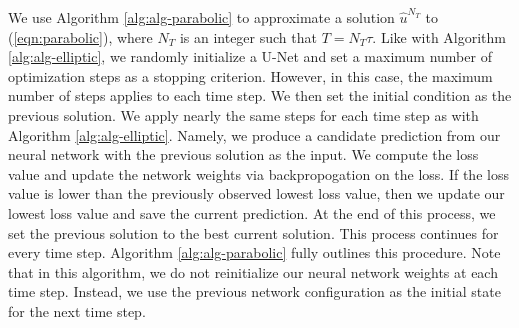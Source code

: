 \documentclass[preprint,12pt]{elsarticle}
\newcommand{\bftheta}{\boldsymbol{\theta}}
\begin{document}

We use Algorithm \ref{alg:alg-parabolic} to approximate a solution $\hat{u}^{N_T}$ to (\ref{eqn:parabolic}), where $N_T$ is an integer such that $T = N_T \tau$. Like with Algorithm \ref{alg:alg-elliptic}, we randomly initialize a U-Net and set a maximum number of optimization steps as a stopping criterion. However, in this case, the maximum number of steps applies to each time step. We then set the initial condition as the previous solution. We apply nearly the same steps for each time step as with Algorithm \ref{alg:alg-elliptic}. Namely, we produce a candidate prediction from our neural network with the previous solution as the input. We compute the loss value and update the network weights via backpropogation on the loss. If the loss value is lower than the previously observed lowest loss value, then we update our lowest loss value and save the current prediction. At the end of this process, we set the previous solution to the best current solution. This process continues for every time step. Algorithm \ref{alg:alg-parabolic} fully outlines this procedure. Note that in this algorithm, we do not reinitialize our neural network weights at each time step. Instead, we use the previous network configuration as the initial state for the next time step.
\end{document}
